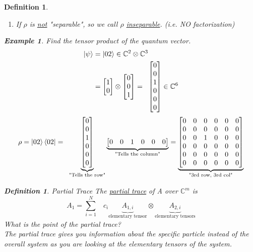 \documentclass[12pt]{article}
\theoremstyle{plain}
\theoremstyle{nonumberplain}
\theoremstyle{plain}
\newtheorem{definition}[lemma]{Definition}
\newtheorem{example}[lemma]{Example}
\theoremstyle{nonumberplain}
\newcommand\1{{\bf 1}}
\newcommand{\bmat}[1]{\begin{bmatrix*} #1 \end{bmatrix*}} %
\newcommand{\C}{\mathbb{C}} %
\newcommand{\<}{\left\langle}
\renewcommand{\>}{\right\rangle}
\begin{document}
\begin{definition}
\begin{enumerate}
\item If $\rho$ is \underline{not} "separable", so we call $\rho$ \underline{inseparable}.          (i.e. NO factorization)\\
\end{enumerate}
\pagebreak
\begin{example} Find the tensor product of the quantum vector.
\begin{equation}  
\begin{split}
\ket{\psi} &= \ket{02} \in \C^2 \otimes \C^3 \\
&= \bmat{1\\ 0} \otimes \bmat{0\\ 0\\ 1} =\;\; \bmat{0\\ 0\\ 1\\ 0\\ 0\\ 0} \in \C^6\\
\end{split}
\end{equation}
\begin{equation}
\rho = \ket{02}\bra{02} =  \;\; \underbrace{\bmat{0\\ 0\\ 1\\ 0\\ 0\\ 0}}_{\text{"Tells the row"}}  \underbrace{\bmat{0& 0& 1& 0& 0& 0}}_{\text{"Tells the column"}} = \underbrace{\bmat{0&0&0&0&0&0\\0&0&0&0&0&0\\0&0&1&0&0&0\\0&0&0&0&0&0\\0&0&0&0&0&0\\0&0&0&0&0&0}}_{\text{"3rd row, 3rd col"}}
\end{equation}
\end{example}

\begin{definition} Partial Trace
The \underline{partial trace} of A over $\C^m$ is\\
 \begin{equation}
 A_1 = \sum_{i=1}^N \;\;\;c_i \underbrace{A_{1,i}}_{\text{elementary tensor}} \otimes \underbrace{A_{2,i}}_{\text{elementary tensors}}
\end{equation}
What is the point of the partial trace?\\
The partial trace gives you information about the specific particle instead of the overall system as you are looking at the elementary tensors of the system.  
\end{definition}
\end{definition}
\end{document}
